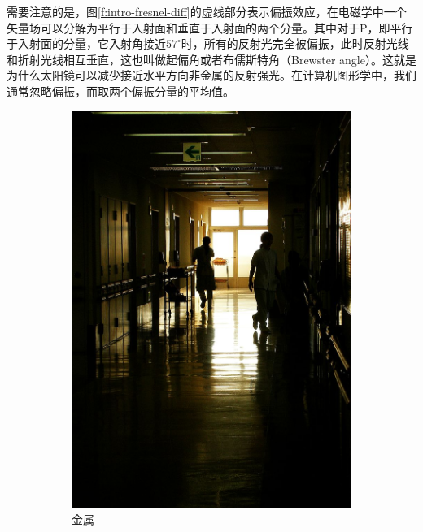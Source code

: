 需要注意的是，图\ref{f:intro-fresnel-diff}的虚线部分表示偏振效应，在电磁学中一个矢量场可以分解为平行于入射面和垂直于入射面的两个分量。其中对于P，即平行于入射面的分量，它入射角接近$57^{\circ}$时，所有的反射光完全被偏振，此时反射光线和折射光线相互垂直，这也叫做起偏角或者布儒斯特角（Brewster angle）。这就是为什么太阳镜可以减少接近水平方向非金属的反射强光。在计算机图形学中，我们通常忽略偏振，而取两个偏振分量的平均值。

\begin{figure}
	\begin{subfigure}[b]{0.5\textwidth}
		\includegraphics[width=1.\textwidth]{figures/intro/fresnel-3}
		\caption{金属}
	\end{subfigure}
	\begin{subfigure}[b]{0.5\textwidth}

\end{subfigure}
\end{figure}
